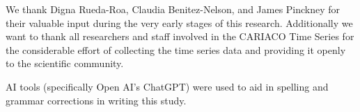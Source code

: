 \documentclass[draft]{agujournal2019}
\begin{document}


\acknowledgments
We thank Digna Rueda-Roa, Claudia Benitez-Nelson, and James Pinckney for their valuable input during the very early stages of this research. Additionally we want to thank all researchers and staff involved in the CARIACO Time Series for the considerable effort of collecting the time series data and providing it openly to the scientific community.

AI tools (specifically Open AI's ChatGPT) were used to aid in spelling and grammar corrections in writing this study.
\end{document}
